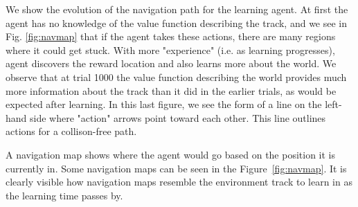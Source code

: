 We show the evolution of the navigation path for the learning agent. At first the agent has no knowledge of the value function describing the track, and we see in Fig. \ref{fig:navmap} that if the agent takes these actions, there are many regions where it could get stuck. With more "experience" (i.e. as learning progresses), agent discovers the reward location and also learns more about the world. We observe that at trial 1000 the value function describing the world provides much more information about the track than it did in the earlier trials, as would be expected after learning. In this last figure, we see the form of a line on the left-hand side where "action" arrows point toward each other. This line outlines actions for a collison-free path.    

A navigation map shows where the agent would go based on the position it is
currently in. Some navigation maps can be seen in the Figure~\ref{fig:navmap}.
It is clearly visible how navigation maps resemble the environment track to
learn in as the learning time passes by.

